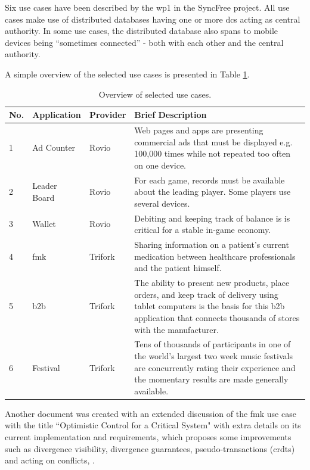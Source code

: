 \documentclass[12pt,twoside]{article}
\begin{document}
Six use cases have been described by the \gls{wp1} in the SyncFree project. All use cases make use of distributed databases having one or more \glspl{dc} acting as central authority. In some use cases, the distributed database also spans to mobile devices being “sometimes connected” - both with each other and the central authority. 

A simple overview of the selected use cases is presented in Table \ref{tb:use_cases}.
\begin{table}[ht!]
	\begin{tabular}{|l|p{2.8cm}|l|p{8.1cm}|}
		\hline
		No. & Application & Provider & Brief Description \\
		\hline
		\hline
		1 & Ad Counter & Rovio & Web pages and apps are presenting commercial ads that must be displayed e.g. 100,000 times while not repeated too often on one device. \\
		\hline
		2 & Leader Board & Rovio & For each game, records must be available about the leading player. Some players use several devices. \\
		\hline
		3 & Wallet & Rovio & Debiting and keeping track of balance is is critical for a stable in-game economy. \\
		\hline
		4 & \gls{fmk} & Trifork & Sharing information on a patient’s current medication between healthcare professionals and the patient himself. \\
		\hline
		5 & \gls{b2b} & Trifork & The ability to present new products, place orders, and keep track of delivery using tablet computers is the basis for this \gls{b2b} application that connects thousands of stores with the manufacturer. \\
		\hline
		6 & Festival & Trifork & Tens of thousands of participants in one of the world’s largest two week music festivals are concurrently rating their experience and the momentary results are made generally available. \\
		\hline
	\end{tabular}
	
	\caption{Overview of selected use cases.}
	\label{tb:use_cases}
\end{table}

Another document was created with an extended discussion of the \gls{fmk} use case with the title ``Optimistic Control for a Critical System" with extra details on its current implementation and requirements, which proposes some improvements such as divergence visibility, divergence guarantees, pseudo-transactions (\glspl{crdt}) and acting on conflicts, \cite{Benedictus2014b}.
\end{document}
